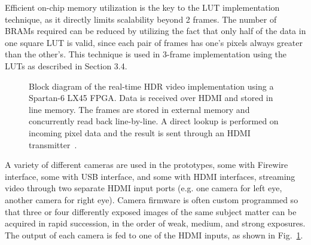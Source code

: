 Efficient on-chip memory utilization is the key to the LUT implementation
technique, as it directly limits scalability beyond 2 frames. The
number of BRAMs required can be reduced by utilizing the fact that
only half of the data in one square LUT is valid, since each pair of
frames has one's pixels always greater than the other's. This
technique is used in 3-frame implementation using the LUTs as
described in Section 3.4.

\begin{figure}
\center
{}
 \caption { Block diagram of the real-time HDR video implementation
   using a Spartan-6 LX45 FPGA.  Data is received over HDMI and stored
   in line memory.  The frames are stored in external memory and
   concurrently read back line-by-line.  A direct lookup is performed
   on incoming pixel data and the result is sent through an HDMI
   transmitter~\cite{mann2012realtime}. }
 \label{fig:fpgahdr}
\end{figure}

A variety of different cameras are used in the prototypes, some with
Firewire interface, some with USB interface, and some with HDMI
interfaces, streaming video through two separate HDMI input ports
(e.g. one camera for left eye, another camera for right eye).  Camera
firmware is often custom programmed so that three or four
differently exposed images of the same subject matter can be acquired in rapid
succession, in the order of weak, medium, and strong exposures.  The
output of each camera is fed to one of the HDMI inputs, as shown in
Fig.~\ref{fig:fpgahdr}.


